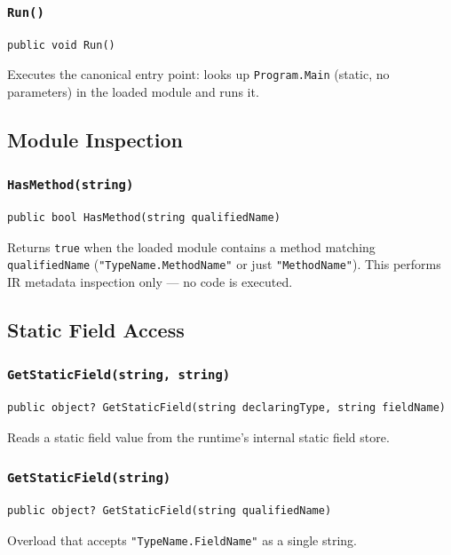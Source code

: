 \documentclass[11pt,a4paper]{article}
\newcommand{\code}[1]{\texttt{\small #1}}
\begin{document}
\subsubsection{\texttt{Run()}}
\begin{lstlisting}[style=cs]
public void Run()
\end{lstlisting}
Executes the canonical entry point: looks up \code{Program.Main} (static, no
parameters) in the loaded module and runs it.

\subsection{Module Inspection}

\subsubsection{\texttt{HasMethod(string)}}
\begin{lstlisting}[style=cs]
public bool HasMethod(string qualifiedName)
\end{lstlisting}
Returns \code{true} when the loaded module contains a method matching
\code{qualifiedName} (\texttt{"TypeName.MethodName"} or just \texttt{"MethodName"}).
This performs IR metadata inspection only --- no code is executed.

\subsection{Static Field Access}

\subsubsection{\texttt{GetStaticField(string, string)}}
\begin{lstlisting}[style=cs]
public object? GetStaticField(string declaringType, string fieldName)
\end{lstlisting}
Reads a static field value from the runtime's internal static field store.

\subsubsection{\texttt{GetStaticField(string)}}
\begin{lstlisting}[style=cs]
public object? GetStaticField(string qualifiedName)
\end{lstlisting}
Overload that accepts \texttt{"TypeName.FieldName"} as a single string.
\end{document}
